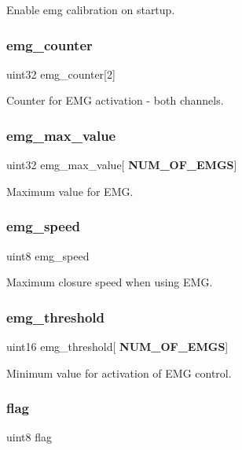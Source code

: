 Enable emg calibration on startup. \mbox{\label{structst__mem_a4f0e42865ba18f09c8cd90f8cd36534c}} 
\subsubsection{emg\+\_\+counter}
{\footnotesize\ttfamily uint32 emg\+\_\+counter[2]}

Counter for E\+MG activation -\/ both channels. \mbox{\label{structst__mem_aeb71cf2bff2584abb616d4b5dcc4c4af}} 
\subsubsection{emg\+\_\+max\+\_\+value}
{\footnotesize\ttfamily uint32 emg\+\_\+max\+\_\+value[\textbf{ N\+U\+M\+\_\+\+O\+F\+\_\+\+E\+M\+GS}]}

Maximum value for E\+MG. \mbox{\label{structst__mem_ae8e800591064bf14eb2dd3a3fb2c325b}} 
\subsubsection{emg\+\_\+speed}
{\footnotesize\ttfamily uint8 emg\+\_\+speed}

Maximum closure speed when using E\+MG. \mbox{\label{structst__mem_aaeb84b2fd1a137ee9234fd3c24c97aaa}} 
\subsubsection{emg\+\_\+threshold}
{\footnotesize\ttfamily uint16 emg\+\_\+threshold[\textbf{ N\+U\+M\+\_\+\+O\+F\+\_\+\+E\+M\+GS}]}

Minimum value for activation of E\+MG control. \mbox{\label{structst__mem_af11e40d15a1361229a78e772af5b3c94}} 
\subsubsection{flag}
{\footnotesize\ttfamily uint8 flag}

